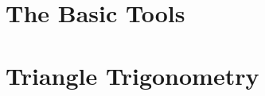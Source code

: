 \part{The Basic Tools}
\label{part:the_basic_tools}





\newpage

\part{Triangle Trigonometry}
\label{part:triangle_trigonometry}





\newpage
